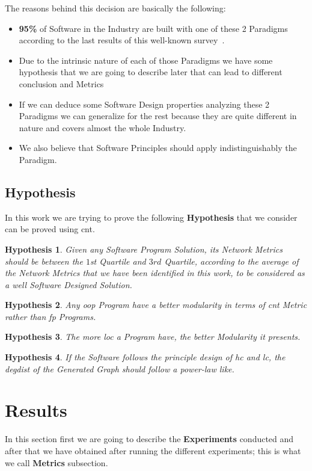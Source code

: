\documentclass[12pt, a4paper]{article}
\newtheorem{hyp}{Hypothesis}
\begin{document}
The reasons behind this decision are basically the following:

\begin{itemize}
    \item \textbf{95\%} of Software in the Industry are built with one of these 2 Paradigms according to the last results of this well-known survey~\cite{so_survey}.
    \item Due to the intrinsic nature of each of those Paradigms we have some hypothesis that we are going to describe later that can lead to different conclusion and Metrics
    \item If we can deduce some Software Design properties analyzing these 2 Paradigms we can generalize for the rest because they are quite different in nature and covers almost the whole Industry.
    \item We also believe that Software Principles should apply indistinguishably the Paradigm. 
\end{itemize}


\subsection{Hypothesis}
In this work we are trying to prove the following \textbf{Hypothesis} that we consider can be proved using \acrfull{cnt}.

\begin{hyp}
Given any Software Program Solution, its Network Metrics should be between the  $1$st Quartile and $3rd$ Quartile, according to the average of the Network Metrics that we have been identified in this work,
to be considered as a well Software Designed Solution.
\end{hyp}

\begin{hyp}
Any \acrlong{oop} Program have a better modularity in terms of \acrlong{cnt} Metric rather than \acrlong{fp} Programs.
\end{hyp}

\begin{hyp}
The more \acrfull{loc} a Program have, the better Modularity it presents.
\end{hyp}
    
\begin{hyp}
If the Software follows the principle design of \acrshort{hc} and \acrshort{lc}, the \acrfull{degdist} of the Generated Graph should follow a power-law like.
\end{hyp}

\section{Results}
In this section first we are going to describe the \textbf{Experiments} conducted and after that we have obtained after running the different experiments; this is what we call \textbf{Metrics} subsection.
\end{document}
